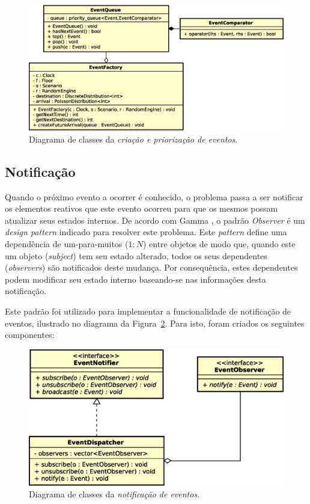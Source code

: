 \begin{figure}[htb!]
  \centering
  \includegraphics[scale=0.6]{img/EventQueue}
  \caption{Diagrama de classes da \textit{criação e priorização de eventos}.}
\label{fig:diagram:event:manage}
\end{figure}

\subsection{Notificação}

Quando o próximo evento a ocorrer é conhecido, o problema passa a ser notificar
os elementos reativos que este evento ocorreu para que os mesmos possam
atualizar seus estados internos. De acordo com Gamma
\cite{Gamma:1995:DPE:186897}, o padrão \textit{Observer} é um \textit{design
pattern} indicado para resolver este problema. Este \textit{pattern} define uma
dependência de um-para-muitos ($1:N$) entre objetos de modo que, quando este um
objeto (\textit{subject}) tem seu estado alterado, todos os seus dependentes
(\textit{observers}) são notificados deste mudança. Por consequência, estes
dependentes podem modificar seu estado interno baseando-se nas informações desta
notificação.

Este padrão foi utilizado para implementar a funcionalidade de notificação de
eventos, ilustrado no diagrama da Figura~\ref{fig:diagram:notification}. Para
isto, foram criados os seguintes componentes:

\begin{figure}[htb!]
  \centering
  \includegraphics[scale=0.6]{img/EventNotifier}
  \caption{Diagrama de classes da \textit{notificação de eventos}.}
\label{fig:diagram:notification}
\end{figure}

